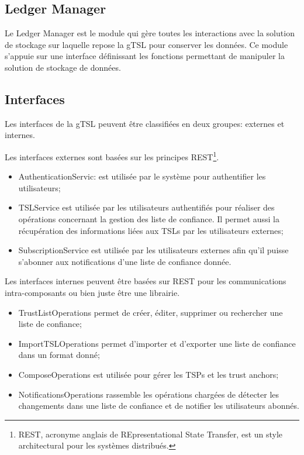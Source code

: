 \documentclass{tnreport}
\begin{document}
\subsection{Ledger Manager}

Le Ledger Manager est le module qui gère toutes les interactions avec la solution de stockage sur laquelle repose la gTSL pour conserver les données. Ce module s'appuie sur une interface définissant les fonctions permettant de manipuler la solution de stockage de données.

\iffalse
\subsection{Interfaces}

Les interfaces de la gTSL peuvent être classifiées en deux groupes: externes et internes.


Les interfaces externes sont basées sur les principes REST\footnote{REST, acronyme anglais de REpresentational State Transfer, est un style architectural pour les systèmes distribués.}.

\begin{itemize}
	\item AuthenticationServic: est utilisée par le système pour authentifier les utilisateurs;
	\item TSLService est utilisée par les utilisateurs authentifiés pour réaliser des opérations concernant la gestion des liste de confiance. Il permet aussi la récupération des informations liées aux TSLs par les utilisateurs externes;
	\item SubscriptionService est utilisée par les utilisateurs externes afin qu'il puisse s'abonner aux notifications d'une liste de confiance donnée.
\end{itemize}


Les interfaces internes peuvent être basées sur REST pour les communications intra-composants ou bien juste être une librairie.

\begin{itemize}
	\item TrustListOperations permet de créer, éditer, supprimer ou rechercher une liste de confiance;
	\item ImportTSLOperations permet d'importer et d'exporter une liste de confiance dans un format donné;
	\item ComposeOperations est utilisée pour gérer les TSPs et les trust anchors;
	\item NotificationsOperations rassemble les opérations chargées de détecter les changements dans une liste de confiance et de notifier les utilisateurs abonnés.
\end{itemize}
\end{document}
